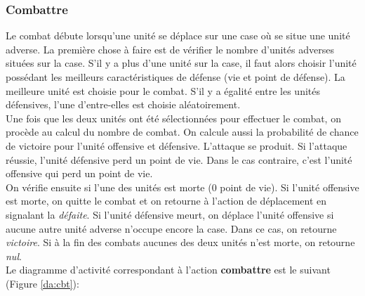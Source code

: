 \documentclass[a4paper,11pt]{article}
\begin{document}
\subsubsection{Combattre}
Le combat débute lorsqu'une unité se déplace sur une case où se situe une unité adverse. La première chose à faire est de vérifier le nombre d'unités adverses situées sur la case. S'il y a plus d'une unité sur la case, il faut alors choisir l'unité possédant les meilleurs caractéristiques de défense (vie et point de défense). La meilleure unité est choisie pour le combat. S'il y a égalité entre les unités défensives, l'une d'entre-elles est choisie aléatoirement.\\ 
\label{subsub:cbt}
Une fois que les deux unités ont été sélectionnées pour effectuer le combat, on procède au calcul du nombre de combat. On calcule aussi la probabilité de chance de victoire pour l'unité offensive et défensive. L'attaque se produit. Si l'attaque réussie, l'unité défensive perd un point de vie. Dans le cas contraire, c'est l'unité offensive qui perd un point de vie.\\ 
On vérifie ensuite si l'une des unités est morte (0 point de vie). Si l'unité offensive est morte, on quitte le combat et on retourne à l'action de déplacement en signalant la \textit{défaite}. Si l'unité défensive meurt, on déplace l'unité offensive si aucune autre unité adverse n'occupe encore la case. Dans ce cas, on retourne \textit{victoire}. Si à la fin des combats aucunes des deux unités n'est morte, on retourne \textit{nul}.\\
Le diagramme d'activité correspondant à l'action \textbf{combattre} est le suivant (Figure \ref{da:cbt}):
\end{document}
